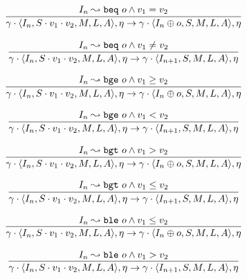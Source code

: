 \documentclass[declaration,shortabstract,english,mgr]{iithesis}
\newcommand{\mstate}[5] {
	\langle#1, #2, #3, #4, #5\rangle
}
\newcommand{\ipointsto}[3] {
	#1 \leadsto \texttt{#2} \text{ } #3
}
\begin{document}
\begin{equation}
\label{eq:semantics_beq1}
	\infer{
		\gamma \cdot \mstate{I_n}{S \cdot v_1 \cdot v_2}{M}{L}{A}, \eta
			\rightarrow
		\gamma \cdot \mstate{I_{n} \oplus o}{S}{M}{L}{A}, \eta
	}
	{\ipointsto{I_n}{beq}{o} \land v_1 = v_2}
\end{equation}

\begin{equation}
\label{eq:semantics_beq2}
	\infer{
		\gamma \cdot \mstate{I_n}{S \cdot v_1 \cdot v_2}{M}{L}{A}, \eta
			\rightarrow
		\gamma \cdot \mstate{I_{n+1}}{S}{M}{L}{A}, \eta
	}
	{\ipointsto{I_n}{beq}{o} \land v_1 \neq v_2}
\end{equation}

\begin{equation}
\label{eq:semantics_bge1}
	\infer{
		\gamma \cdot \mstate{I_n}{S \cdot v_1 \cdot v_2}{M}{L}{A}, \eta
			\rightarrow
		\gamma \cdot \mstate{I_{n} \oplus o}{S}{M}{L}{A}, \eta
	}
	{\ipointsto{I_n}{bge}{o} \land v_1 \geq v_2}
\end{equation}

\begin{equation}
\label{eq:semantics_bge2}
	\infer{
		\gamma \cdot \mstate{I_n}{S \cdot v_1 \cdot v_2}{M}{L}{A}, \eta
			\rightarrow
		\gamma \cdot \mstate{I_{n+1}}{S}{M}{L}{A}, \eta
	}
	{\ipointsto{I_n}{bge}{o} \land v_1 < v_2}
\end{equation}

\begin{equation}
\label{eq:semantics_bgt1}
	\infer{
		\gamma \cdot \mstate{I_n}{S \cdot v_1 \cdot v_2}{M}{L}{A}, \eta
			\rightarrow
		\gamma \cdot \mstate{I_{n} \oplus o}{S}{M}{L}{A}, \eta
	}
	{\ipointsto{I_n}{bgt}{o} \land v_1 > v_2}
\end{equation}

\begin{equation}
\label{eq:semantics_bgt2}
	\infer{
		\gamma \cdot \mstate{I_n}{S \cdot v_1 \cdot v_2}{M}{L}{A}, \eta
			\rightarrow
		\gamma \cdot \mstate{I_{n+1}}{S}{M}{L}{A}, \eta
	}
	{\ipointsto{I_n}{bgt}{o} \land v_1 \leq v_2}
\end{equation}

\begin{equation}
\label{eq:semantics_ble1}
	\infer{
		\gamma \cdot \mstate{I_n}{S \cdot v_1 \cdot v_2}{M}{L}{A}, \eta
			\rightarrow
		\gamma \cdot \mstate{I_{n} \oplus o}{S}{M}{L}{A}, \eta
	}
	{\ipointsto{I_n}{ble}{o} \land v_1 \leq v_2}
\end{equation}

\begin{equation}
\label{eq:semantics_ble2}
	\infer{
		\gamma \cdot \mstate{I_n}{S \cdot v_1 \cdot v_2}{M}{L}{A}, \eta
			\rightarrow
		\gamma \cdot \mstate{I_{n+1}}{S}{M}{L}{A}, \eta
	}
	{\ipointsto{I_n}{ble}{o} \land v_1 > v_2}
\end{equation}
\end{document}
